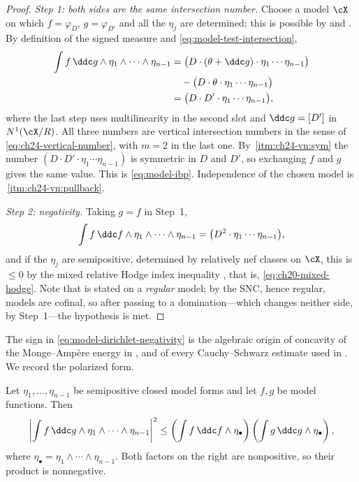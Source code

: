 \begin{proof}
\emph{Step 1: both sides are the same intersection number.}  Choose a model
\(\cX\) on which \(f=\varphi_D\), \(g=\varphi_{D'}\) and all the \(\eta_j\)
are determined; this is possible by  and
.  By definition of the signed measure and
\eqref{eq:model-test-intersection},
\[
 \begin{aligned}
 \int f\,\ddc g\wedge\eta_1\wedge\cdots\wedge\eta_{n-1}
 &=\bigl(D\cdot(\theta+\ddc g)\cdot\eta_1\cdots\eta_{n-1}\bigr)\\
 &\quad-\bigl(D\cdot\theta\cdot\eta_1\cdots\eta_{n-1}\bigr)\\
 &=\bigl(D\cdot D'\cdot\eta_1\cdots\eta_{n-1}\bigr),
 \end{aligned}
\]
where the last step uses multilinearity in the second slot and
\(\ddc g=[D']\) in \(N^1(\cX/R)\).  All three numbers are vertical
intersection numbers in the sense of \eqref{eq:ch24-vertical-number}, with
\(m=2\) in the last one.  By
\,\cref{itm:ch24-vn:sym} the number
\((D\cdot D'\cdot\eta_1\cdots\eta_{n-1})\) is symmetric in \(D\) and
\(D'\), so exchanging \(f\) and \(g\) gives the same value.  This is
\eqref{eq:model-ibp}.  Independence of the chosen model is
\,\cref{itm:ch24-vn:pullback}.

\emph{Step 2: negativity.}  Taking \(g=f\) in Step~1,
\[
 \int f\,\ddc f\wedge\eta_1\wedge\cdots\wedge\eta_{n-1}
 =\bigl(D^2\cdot\eta_1\cdots\eta_{n-1}\bigr),
\]
and if the \(\eta_j\) are semipositive, determined by relatively nef classes
on \(\cX\), this is \(\leq0\) by the mixed relative Hodge index inequality
, that is,
\eqref{eq:ch20-mixed-hodge}.  Note that  is
stated on a \emph{regular} model; by  the SNC, hence
regular, models are cofinal, so after passing to a domination---which
changes neither side, by Step~1---the hypothesis is met.
\end{proof}

The sign in \eqref{eq:model-dirichlet-negativity} is the algebraic origin of
concavity of the Monge--Amp\`ere energy in , and of
every Cauchy--Schwarz estimate used in .  We record
the polarized form.

\begin{proposition}
\label{prop:ch24-model-cauchy-schwarz}
Let \(\eta_1,\ldots,\eta_{n-1}\) be semipositive closed model forms and let
\(f,g\) be model functions.  Then
\begin{equation}
\label{eq:ch24-model-cauchy-schwarz}
 \left|\int f\,\ddc g\wedge\eta_1\wedge\cdots\wedge\eta_{n-1}\right|^{2}
 \leq
 \left(\int f\,\ddc f\wedge\eta_\bullet\right)
 \left(\int g\,\ddc g\wedge\eta_\bullet\right),
\end{equation}
where \(\eta_\bullet=\eta_1\wedge\cdots\wedge\eta_{n-1}\).  Both factors on
the right are nonpositive, so their product is nonnegative.
\end{proposition}


